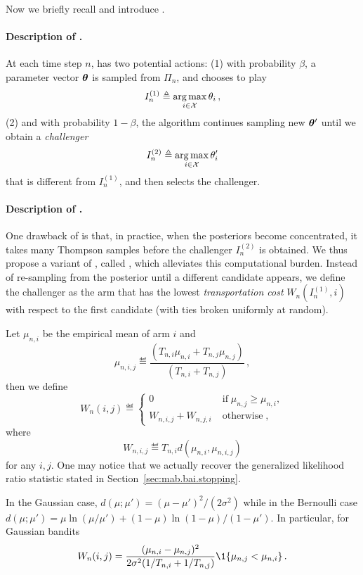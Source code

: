 Now we briefly recall \TTTS and introduce \TCC.

\paragraph{Description of \TTTS.} 
At each time step $n$, \TTTS has two potential actions: (1) with probability $\beta$, a parameter vector ${\boldsymbol \theta}$ is sampled from $\Pi_{n}$, and \TTTS chooses to play 
\[
    I_n^{(1)} \triangleq \operatorname*{arg\,max}_{i\in\mathcal{X}} \theta_i\,,
\] 
(2) and with probability $1-\beta$, the algorithm continues sampling new ${\boldsymbol \theta}'$ until we obtain a \emph{challenger} 
\[
I_n^{(2)} \triangleq \operatorname*{arg\,max}_{i\in\mathcal{X}} \theta_i'
\]
that is different from $I_n^{(1)}$, and \TTTS then selects the challenger.

\paragraph{Description of \TCC.} 
One drawback of \TTTS is that, in practice, when the posteriors become concentrated, it takes many Thompson samples before the challenger $I_n^{(2)}$ is obtained. We thus propose a variant of \TTTS, called \TCC, which alleviates this computational burden. Instead of re-sampling from the posterior until a different candidate appears, we define the challenger as the arm that has the lowest \emph{transportation cost} $W_n(I_n^{(1)},i)$ with respect to the first candidate (with ties broken uniformly at random). 

Let $\mu_{n,i}$ be the empirical mean of arm $i$ and 
\[
    \mu_{n,i,j} \eqdef \dfrac{(T_{n,i}\mu_{n,i} +T_{n,j}\mu_{n,j})}{(T_{n,i}+T_{n,j})}\,,
\]
then we define
\begin{equation}\label{def:Transportation}
	W_n(i,j) \eqdef
	\left\{ \begin{array}{ll}
				0 & \operatorname{if} \mu_{n,j} \geq \mu_{n,i},\\
				W_{n,i,j}+W_{n,j,i} & \operatorname{otherwise},
			\end{array}\right.
\end{equation}
where 
\[
    W_{n,i,j}\eqdef T_{n,i} d\left(\mu_{n,i},\mu_{n,i,j}\right)
\]
for any $i,j$. One may notice that we actually recover the generalized likelihood ratio statistic stated in Section~\ref{sec:mab.bai.stopping}.

In the Gaussian case, $d(\mu;\mu') = (\mu-\mu')^2/(2\sigma^2)$ while in the Bernoulli case $d(\mu;\mu') = \mu \ln (\mu/\mu') + (1-\mu)\ln (1-\mu)/(1-\mu')$.
In particular, for Gaussian bandits 
\[
    W_n(i,j) = \dfrac{(\mu_{n,i}-\mu_{n,j})^2}{2\sigma^2(1/T_{n,i}+1/T_{n,j})}\1\{\mu_{n,j}<\mu_{n,i}\}\,.
\]


